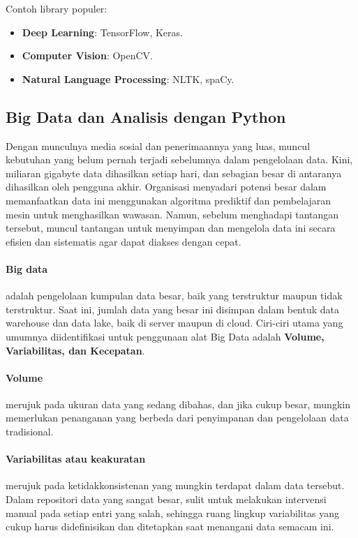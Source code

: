 \documentclass{article}
\begin{document}
Contoh library populer:
\begin{itemize}
    \item \textbf{Deep Learning}: TensorFlow, Keras.
    \item \textbf{Computer Vision}: OpenCV.
    \item \textbf{Natural Language Processing}: NLTK, spaCy.
\end{itemize}

\subsection{Big Data dan Analisis dengan Python}
Dengan munculnya media sosial dan penerimaannya yang luas, muncul kebutuhan yang belum pernah terjadi sebelumnya dalam pengelolaan data. Kini, miliaran gigabyte data dihasilkan setiap hari, dan sebagian besar di antaranya dihasilkan oleh pengguna akhir. Organisasi menyadari potensi besar dalam memanfaatkan data ini menggunakan algoritma prediktif dan pembelajaran mesin untuk menghasilkan wawasan. Namun, sebelum menghadapi tantangan tersebut, muncul tantangan untuk menyimpan dan mengelola data ini secara efisien dan sistematis agar dapat diakses dengan cepat.

\paragraph{Big data} adalah pengelolaan kumpulan data besar, baik yang terstruktur maupun tidak terstruktur. Saat ini, jumlah data yang besar ini disimpan dalam bentuk data warehouse dan data lake, baik di server maupun di cloud. Ciri-ciri utama yang umumnya diidentifikasi untuk penggunaan alat Big Data adalah \textbf{Volume, Variabilitas, dan Kecepatan}.

\paragraph{Volume} merujuk pada ukuran data yang sedang dibahas, dan jika cukup besar, mungkin memerlukan penanganan yang berbeda dari penyimpanan dan pengelolaan data tradisional.

\paragraph{Variabilitas atau keakuratan} merujuk pada ketidakkonsistenan yang mungkin terdapat dalam data tersebut. Dalam repositori data yang sangat besar, sulit untuk melakukan intervensi manual pada setiap entri yang salah, sehingga ruang lingkup variabilitas yang cukup harus didefinisikan dan ditetapkan saat menangani data semacam ini.
\end{document}
